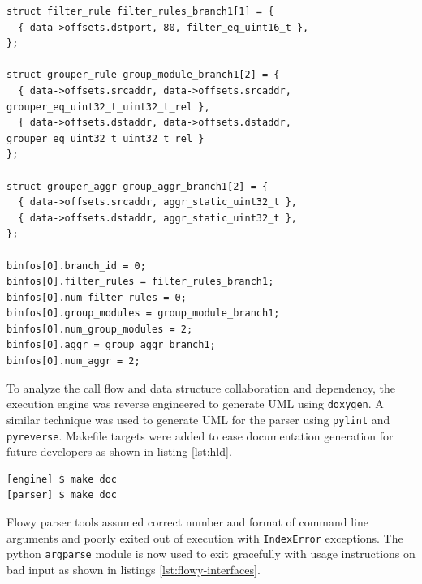 \begin{lstlisting}
struct filter_rule filter_rules_branch1[1] = {
  { data->offsets.dstport, 80, filter_eq_uint16_t },
};

struct grouper_rule group_module_branch1[2] = {
  { data->offsets.srcaddr, data->offsets.srcaddr, grouper_eq_uint32_t_uint32_t_rel },
  { data->offsets.dstaddr, data->offsets.dstaddr, grouper_eq_uint32_t_uint32_t_rel }
};

struct grouper_aggr group_aggr_branch1[2] = {
  { data->offsets.srcaddr, aggr_static_uint32_t },
  { data->offsets.dstaddr, aggr_static_uint32_t },
};

binfos[0].branch_id = 0;
binfos[0].filter_rules = filter_rules_branch1;
binfos[0].num_filter_rules = 0;
binfos[0].group_modules = group_module_branch1;
binfos[0].num_group_modules = 2;
binfos[0].aggr = group_aggr_branch1;
binfos[0].num_aggr = 2;
\end{lstlisting}

To analyze the call flow and data structure collaboration and dependency, the
execution engine was reverse engineered to generate \ac{UML} using
\texttt{doxygen}.   A similar technique was
used to generate \ac{UML} for the parser using \texttt{pylint} and
\texttt{pyreverse}. Makefile targets were added to ease documentation
generation for future developers as shown in listing \ref{lst:hld}.

\begin{lstlisting}
[engine] $ make doc
[parser] $ make doc
\end{lstlisting}

Flowy parser tools assumed correct number and format of command line arguments
and poorly  exited out of execution
with \texttt{IndexError} exceptions.  The python \texttt{argparse} module is
now used to exit gracefully with usage instructions on bad input as shown in
listings \ref{lst:flowy-interfaces}.

